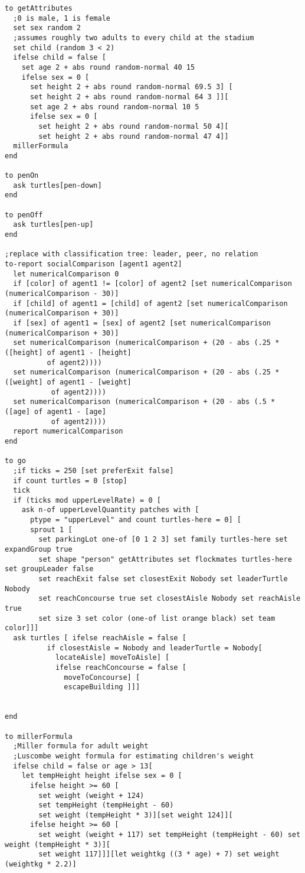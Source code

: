 \documentclass{article}
\begin{document}
\begin{lstlisting}
to getAttributes
  ;0 is male, 1 is female
  set sex random 2
  ;assumes roughly two adults to every child at the stadium
  set child (random 3 < 2)
  ifelse child = false [
    set age 2 + abs round random-normal 40 15 
    ifelse sex = 0 [
      set height 2 + abs round random-normal 69.5 3] [
      set height 2 + abs round random-normal 64 3 ]][
      set age 2 + abs round random-normal 10 5 
      ifelse sex = 0 [
        set height 2 + abs round random-normal 50 4][
        set height 2 + abs round random-normal 47 4]] 
  millerFormula
end

to penOn
  ask turtles[pen-down]
end

to penOff
  ask turtles[pen-up]
end

;replace with classification tree: leader, peer, no relation
to-report socialComparison [agent1 agent2]
  let numericalComparison 0
  if [color] of agent1 != [color] of agent2 [set numericalComparison (numericalComparison - 30)]
  if [child] of agent1 = [child] of agent2 [set numericalComparison (numericalComparison + 30)]
  if [sex] of agent1 = [sex] of agent2 [set numericalComparison (numericalComparison + 30)]
  set numericalComparison (numericalComparison + (20 - abs (.25 * ([height] of agent1 - [height] 
          of agent2))))
  set numericalComparison (numericalComparison + (20 - abs (.25 * ([weight] of agent1 - [weight]
           of agent2))))
  set numericalComparison (numericalComparison + (20 - abs (.5 * ([age] of agent1 - [age]
           of agent2))))
  report numericalComparison
end

to go
  ;if ticks = 250 [set preferExit false]
  if count turtles = 0 [stop]
  tick
  if (ticks mod upperLevelRate) = 0 [
    ask n-of upperLevelQuantity patches with [
      ptype = "upperLevel" and count turtles-here = 0] [
      sprout 1 [
        set parkingLot one-of [0 1 2 3] set family turtles-here set expandGroup true 
        set shape "person" getAttributes set flockmates turtles-here set groupLeader false 
        set reachExit false set closestExit Nobody set leaderTurtle Nobody 
        set reachConcourse true set closestAisle Nobody set reachAisle true 
        set size 3 set color (one-of list orange black) set team color]]]
  ask turtles [ ifelse reachAisle = false [  
          if closestAisle = Nobody and leaderTurtle = Nobody[
            locateAisle] moveToAisle] [
            ifelse reachConcourse = false [
              moveToConcourse] [
              escapeBuilding ]]]

 
end

to millerFormula
  ;Miller formula for adult weight
  ;Luscombe weight formula for estimating children's weight
  ifelse child = false or age > 13[
    let tempHeight height ifelse sex = 0 [
      ifelse height >= 60 [
        set weight (weight + 124) 
        set tempHeight (tempHeight - 60) 
        set weight (tempHeight * 3)][set weight 124]][
      ifelse height >= 60 [
        set weight (weight + 117) set tempHeight (tempHeight - 60) set weight (tempHeight * 3)][
        set weight 117]]][let weightkg ((3 * age) + 7) set weight (weightkg * 2.2)]
  


\end{lstlisting}
\end{document}
